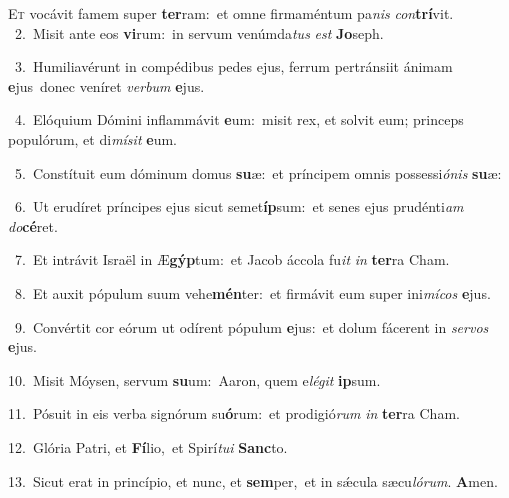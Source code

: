 \lettrine{\initial\textcolor{\initialcolor}{E}}{t} vocávit famem super \textbf{ter}\-ram:~\star et omne firmaméntum pa\textit{nis} \textit{con}\-\textbf{trí}vit.\\
{\numbfont\textcolor{\numbcolor}{~2.}}~Misit ante eos \textbf{vi}\-rum:~\star in servum venúmda\textit{tus} \textit{est} \textbf{Jo}\-seph.\par
{\numbfont\textcolor{\numbcolor}{~3.}}~Humiliavérunt in compédibus pedes ejus, ferrum pertránsiit ánimam \textbf{e}\-jus~\star donec veníret \textit{ver}\-\textit{bum} \textbf{e}\-jus.\par
{\numbfont\textcolor{\numbcolor}{~4.}}~Elóquium Dómini inflammávit \textbf{e}\-um:~\star misit rex, et solvit eum; princeps populórum, et di\-\textit{mí}\-\textit{sit} \textbf{e}\-um.\par
{\numbfont\textcolor{\numbcolor}{~5.}}~Constítuit eum dóminum domus \textbf{su}\-æ:~\star et príncipem omnis possessi\-\textit{ó}\-\textit{nis} \textbf{su}\-æ:\par
{\numbfont\textcolor{\numbcolor}{~6.}}~Ut erudíret príncipes ejus sicut semet\-\textbf{íp}\-sum:~\star et senes ejus prudénti\textit{am} \textit{do}\-\textbf{cé}ret.\par
{\numbfont\textcolor{\numbcolor}{~7.}}~Et intrávit Israël in Æ\-\textbf{gýp}\-tum:~\star et Jacob áccola fu\textit{it} \textit{in} \textbf{ter}\-ra Cham.\par
{\numbfont\textcolor{\numbcolor}{~8.}}~Et auxit pópulum suum vehe\-\textbf{mén}\-ter:~\star et firmávit eum super ini\-\textit{mí}\-\textit{cos} \textbf{e}\-jus.\par
{\numbfont\textcolor{\numbcolor}{~9.}}~Convértit cor eórum ut odírent pópulum \textbf{e}\-jus:~\star et dolum fácerent in \textit{ser}\-\textit{vos} \textbf{e}\-jus.\par
{\numbfont\textcolor{\numbcolor}{10.}}~Misit Móysen, servum \textbf{su}\-um:~\star Aaron, quem e\-\textit{lé}\-\textit{git} \textbf{ip}\-sum.\par
{\numbfont\textcolor{\numbcolor}{11.}}~Pósuit in eis verba signórum su\-\textbf{ó}\-rum:~\star et prodigió\textit{rum} \textit{in} \textbf{ter}\-ra Cham.\par
{\numbfont\textcolor{\numbcolor}{12.}}~Glória Patri, et \textbf{Fí}\-lio,~\star et Spirí\-\textit{tu}\-\textit{i} \textbf{Sanc}\-to.\par
{\numbfont\textcolor{\numbcolor}{13.}}~Sicut erat in princípio, et nunc, et \textbf{sem}\-per,~\star et in sǽcula sæcu\-\textit{ló}\-\textit{rum}. \textbf{A}\-men.\par
